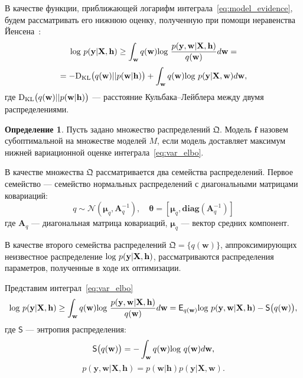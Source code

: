 \documentclass[11pt, a5paper]{dissert}
\theoremstyle{definition}
\newtheorem{defin}{Определение}
\begin{document}
{В качестве функции, приближающей логарифм интеграла~\eqref{eq:model_evidence}, будем рассматривать его нижнюю оценку, полученную при помощи неравенства Йенсена~\cite{bishop}:
\begin{equation} 
\label{eq:var_elbo}
\textnormal{log}~p(\mathbf{y}|\mathbf{X},\mathbf{h})   \geq	\int_{\mathbf{w}} q(\mathbf{w})\textnormal{log}~\frac{p(\mathbf{y},\mathbf{w}|\mathbf{X},\mathbf{h})}{q(\mathbf{w})}d\mathbf{w} =
\end{equation} 
$$
= -\textnormal{D}_\textnormal{KL} \bigl(q(\mathbf{w})||p(\mathbf{w}|\mathbf{h})\bigr) + \int_{\mathbf{w}} q(\mathbf{w})\textnormal{log}~{p(\mathbf{y}|\mathbf{X},\mathbf{w})} d \mathbf{w},
$$
где $\textnormal{D}_\textnormal{KL}\bigl(q(\mathbf{w})||p(\mathbf{w} |\mathbf{h})\bigr)$ --- расстояние Кульбака--Лейблера между двумя распределениями.


\begin{defin} Пусть задано множество распределений $\mathfrak{Q}$. Модель $\mathbf{f}$ назовем субоптимальной на множестве моделей $M$, если модель доставляет максимум нижней вариационной оценке интеграла~\eqref{eq:var_elbo}.
\end{defin}

В качестве множества $\mathfrak{Q}$ рассматривается два семейства распределений.
Первое семейство --- семейство нормальных распределений с диагональными матрицами ковариаций:
\begin{equation}
\label{eq:diag}
	q \sim \mathcal{N}(\boldsymbol{\mu}_q, \mathbf{A}^{-1}_q),\quad\boldsymbol{\theta}=[\boldsymbol{\mu}_q, \textbf{diag}(\mathbf{A}^{-1}_q)]
\end{equation}
где $\mathbf{A}_q$ --- диагональная матрица ковариаций, $\boldsymbol{\mu}_q$ --- вектор средних компонент.

В качестве второго семейства распределений $\mathfrak{Q} = \{q(\mathbf{w})\}$, аппроксимирующих неизвестное распределение $\textnormal{log}~p(\mathbf{y}|\mathbf{X},\mathbf{h})$, рассматриваются распределения параметров, полученные в ходе их оптимизации.

Представим интеграл~\eqref{eq:var_elbo}
\begin{equation}
\label{eq:var_elbo_entropy}
 \textnormal{log}~p(\mathbf{y}|\mathbf{X},\mathbf{h}) \geq \int_\mathbf{w} q(\mathbf{w})\textnormal{log}~\frac{p(\mathbf{y},\mathbf{w}|\mathbf{X}, \mathbf{h})}{q(\mathbf{w})}d\mathbf{w} =  \mathsf{E}_{q(\mathbf{w)}} \textnormal{log~}p (\mathbf{y}, \mathbf{w}|\mathbf{X}, \mathbf{h}) - \mathsf{S}\bigl({q(\mathbf{w)}}\bigr),
\end{equation}
где $\mathsf{S}$ --- энтропия распределения:
\[
\mathsf{S}\bigl({q(\mathbf{w)}}\bigr) = - \int_{\mathbf{w}} q(\mathbf{w})\textnormal{log}~q(\mathbf{w})d\mathbf{w},
\]
$$p (\mathbf{y}, \mathbf{w}|\mathbf{X}, \mathbf{h}) = p (\mathbf{w}| \mathbf{h}) p (\mathbf{y}|\mathbf{X}, \mathbf{w}).$$


}
\end{document}
